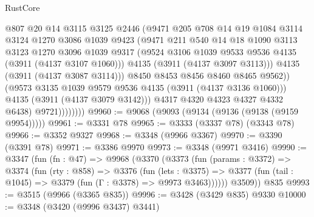 \begin{lexlean}{RustCore}
\begin{coremodule}
                            @807
                            @20
                            @14
                            @3115
                            @3125
                            @2446
                            (@9471
                              @205
                              @708
                              @14
                              @19
                              @1084
                              @3114
                              @3124
                              @1270
                              @3086
                              @1039
                              @9423
                              (@9471
                                @211
                                @540
                                @14
                                @18
                                @1090
                                @3113
                                @3123
                                @1270
                                @3096
                                @1039
                                @9317
                                (@9524 @3106 @1039 @9533 @9536 @4135 (@3911 (@4137 @3107 @1060)))
                                @4135
                                (@3911 (@4137 @3097 @3113)))
                              @4135
                              (@3911 (@4137 @3087 @3114)))
                            @8450
                            @8453
                            @8456
                            @8460
                            @8465
                            @9562))
                        (@9573 @3135 @1039 @9579 @9536 @4135 (@3911 (@4137 @3136 @1060)))
                        @4135
                        (@3911 (@4137 @3079 @3142)))
                      @4317
                      @4320
                      @4323
                      @4327
                      @4332
                      @6438)
                    @9721))))))))
@9960 := @9068 (@9093 (@9134 (@9136 (@9138 (@9159 @9954)))))
@9961 := @3331 @78
@9965 := @3333 (@3337 @78) (@3343 @78)
@9966 := @3352 @9327
@9968 := @3348 (@9966 @3367)
@9970 := @3390 (@3391 @78)
@9971 := @3386 @9970
@9973 := @3348 (@9971 @3416)
@9990 := @3347
    (fun (fn : @47) =>
    @9968
      (@3370
        (@3373
          (fun (params : @3372) =>
          @3374
            (fun (rty : @858) =>
            @3376
              (fun (lets : @3375) =>
              @3377 (fun (tail : @1045) => @3379 (fun (Γ : @3378) => @9973 @3463))))))
        @3509))
    @835
@9993 := @3515 (@9966 (@3365 @835))
@9996 := @3428 (@3429 @835) @9330
@10000 := @3348 (@3420 (@9996 @3437) @3441)

\end{coremodule}
\end{lexlean}
